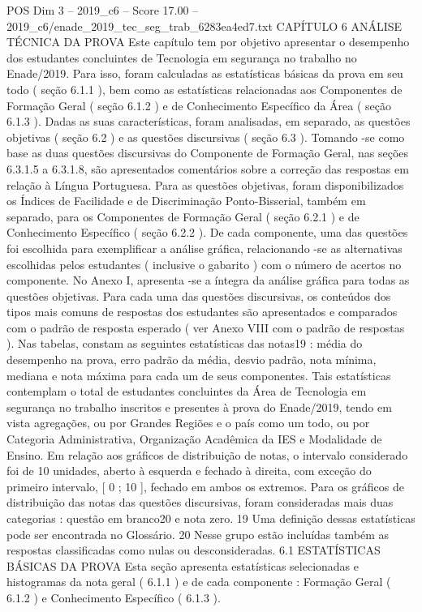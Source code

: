 \begin{textsample}{POS Dim 3 – 2019\_c6 – Score 17.00 – 2019\_c6/enade\_2019\_tec\_seg\_trab\_6283ea4ed7.txt}  \label{ex:f3_pos_003}
CAPÍTULO 6 ANÁLISE TÉCNICA DA PROVA Este capítulo tem por objetivo apresentar o desempenho dos estudantes concluintes de Tecnologia em segurança no trabalho no Enade/2019.
Para isso, foram calculadas as estatísticas básicas da prova em seu todo ( seção 6.1.1 ), bem como as estatísticas relacionadas aos Componentes de Formação Geral ( seção 6.1.2 ) e de Conhecimento Específico da Área ( seção 6.1.3 ).
Dadas as suas características, foram analisadas, em separado, as questões objetivas ( seção 6.2 ) e as questões discursivas ( seção 6.3 ).
Tomando -se como base as duas questões discursivas do Componente de Formação Geral, nas seções 6.3.1.5 a 6.3.1.8, são apresentados comentários sobre a correção das respostas em relação à Língua Portuguesa.
Para as questões objetivas, foram disponibilizados os Índices de Facilidade e de Discriminação Ponto-Bisserial, também em separado, para os Componentes de Formação Geral ( seção 6.2.1 ) e de Conhecimento Específico ( seção 6.2.2 ).
De cada componente, uma das questões foi escolhida para exemplificar a análise gráfica, relacionando -se as alternativas escolhidas pelos estudantes ( inclusive o gabarito ) com o número de acertos no componente.
No Anexo I, apresenta -se a íntegra da análise gráfica para todas as questões objetivas.
Para cada uma das questões discursivas, os conteúdos dos tipos mais comuns de respostas dos estudantes são apresentados e comparados com o padrão de resposta esperado ( ver Anexo VIII com o padrão de respostas ).
Nas tabelas, constam as seguintes estatísticas das notas19 : média do desempenho na prova, erro padrão da média, desvio padrão, nota mínima, mediana e nota máxima para cada um de seus componentes.
Tais estatísticas contemplam o total de estudantes concluintes da Área de Tecnologia em segurança no trabalho inscritos e presentes à prova do Enade/2019, tendo em vista agregações, ou por Grandes Regiões e o país como um todo, ou por Categoria Administrativa, Organização Acadêmica da IES e Modalidade de Ensino.
Em relação aos gráficos de distribuição de notas, o intervalo considerado foi de 10 unidades, aberto à esquerda e fechado à direita, com exceção do primeiro intervalo, [ 0 ; 10 ], fechado em ambos os extremos.
Para os gráficos de distribuição das notas das questões discursivas, foram consideradas mais duas categorias : questão em branco20 e nota zero. 19 Uma definição dessas estatísticas pode ser encontrada no Glossário. 20 Nesse grupo estão incluídas também as respostas classificadas como nulas ou desconsideradas. 6.1 ESTATÍSTICAS BÁSICAS DA PROVA Esta seção apresenta estatísticas selecionadas e histogramas da nota geral ( 6.1.1 ) e de cada componente : Formação Geral ( 6.1.2 ) e Conhecimento Específico ( 6.1.3 ).

\end{textsample}
